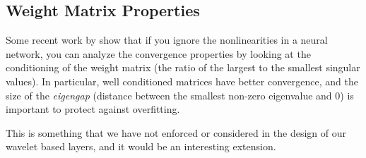 \subsection{Weight Matrix Properties}
Some recent work by \citeauthor{advani_high-dimensional_2017}
\cite{advani_high-dimensional_2017} show that if you ignore the
nonlinearities in a neural network, you can analyze the convergence properties
by looking at the conditioning of the weight matrix (the ratio of the largest to
the smallest singular values). In particular, well conditioned matrices have
better convergence, and the size of the \emph{eigengap} (distance between the
smallest non-zero eigenvalue and 0) is important to protect against overfitting.

This is something that we have not enforced or considered in the design of our
wavelet based layers, and it would be an interesting extension.


